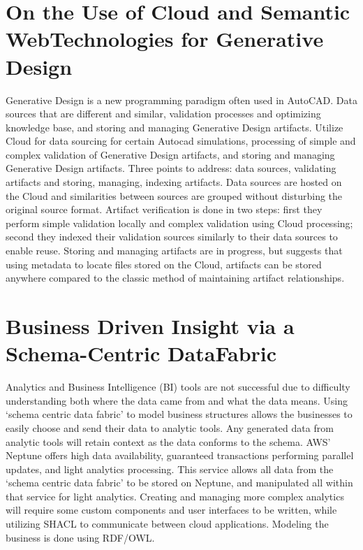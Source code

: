     \section{On the Use of Cloud and Semantic WebTechnologies for Generative Design}

    
    Generative Design is a new programming paradigm often used in AutoCAD. Data sources that are different and similar, validation processes and optimizing knowledge base, and storing and managing Generative Design artifacts.
    Utilize Cloud for data sourcing for certain Autocad simulations, processing of simple and complex validation of Generative Design artifacts, and storing and managing Generative Design artifacts.
    Three points to address: data sources, validating artifacts and storing, managing, indexing artifacts. Data sources are hosted on the Cloud and similarities between sources are grouped without disturbing the original source format. Artifact verification is done in two steps: first they perform simple validation locally and complex validation using Cloud processing; second they indexed their validation sources similarly to their data sources to enable reuse. Storing and managing artifacts are in progress, but suggests that using metadata to locate files stored on the Cloud, artifacts can be stored anywhere compared to the classic method of maintaining artifact relationships.

    \section{Business Driven Insight via a Schema-Centric DataFabric}

    
    Analytics and Business Intelligence (BI) tools are not successful due to difficulty understanding both where the data came from and what the data means.
    Using ‘schema centric data fabric’ to model business structures allows the businesses to easily choose and send their data to analytic tools. Any generated data from analytic tools will retain context as the data conforms to the schema. 
    AWS’ Neptune offers high data availability, guaranteed transactions performing parallel updates, and light analytics processing. This service allows all data from the ‘schema centric data fabric’ to be stored on Neptune, and manipulated all within that service for light analytics. Creating and managing more complex analytics will require some custom components and user interfaces to be written, while utilizing SHACL to communicate between cloud applications. Modeling the business is done using RDF/OWL.

